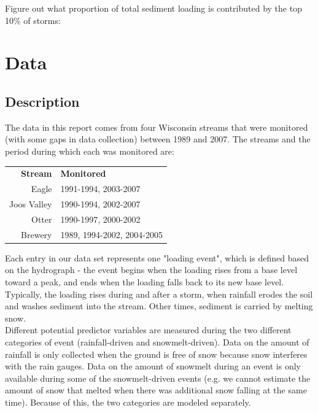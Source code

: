 \documentclass[12pt]{article}
\begin{document}
Figure out what proportion of total sediment loading is contributed by the top 10\% of storms:\\








\section{Data}

\subsection{Description}
The data in this report comes from four Wisconsin streams that were monitored (with some gaps in data collection) between 1989 and 2007. The streams and the period during which each was monitored are:

\begin{table}[h]
    \begin{tabular}{r l}
        \textbf{Stream} & \textbf{Monitored} \\
        Eagle & 1991-1994, 2003-2007\\
        Joos Valley & 1990-1994, 2002-2007\\
        Otter & 1990-1997, 2000-2002\\
        Brewery & 1989, 1994-2002, 2004-2005\\
    \end{tabular}
\end{table}

Each entry in our data set represents one "loading event", which is defined based on the hydrograph - the event begins when the loading rises from a base level toward a peak, and ends when the loading falls back to its new base level. Typically, the loading rises during and after a storm, when rainfall erodes the soil and washes sediment into the stream. Other times, sediment is carried by melting snow.\\

Different potential predictor variables are measured during the two different categories of event (rainfall-driven and snowmelt-driven). Data on the amount of rainfall is only collected when the ground is free of snow because snow interferes with the rain gauges. Data on the amount of snowmelt during an event is only available during some of the snowmelt-driven events (e.g. we cannot estimate the amount of snow that melted when there was additional snow falling at the same time). Because of this, the two categories are modeled separately.\\
\end{document}
